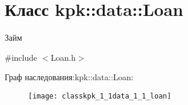 \hypertarget{classkpk_1_1data_1_1_loan}{}\section{Класс kpk\+:\+:data\+:\+:Loan}
\label{classkpk_1_1data_1_1_loan}


Займ  




{\ttfamily \#include $<$Loan.\+h$>$}

Граф наследования\+:kpk\+:\+:data\+:\+:Loan\+:\begin{figure}[H]
\begin{center}
\leavevmode
\texttt{[image: classkpk\_1\_1data\_1\_1\_loan]}
\end{center}
\end{figure}
